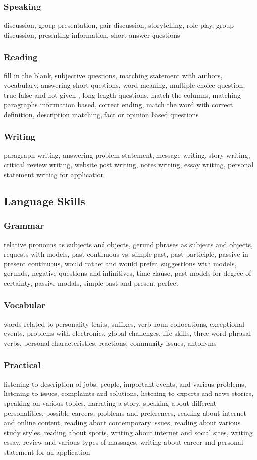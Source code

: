 \documentclass[twocolumn]{article}
\begin{document}
    \subsubsection*{Speaking}
    discussion, group presentation, pair discussion, storytelling, role play, group discussion, presenting information, short answer questions
    \subsubsection*{Reading}
    fill in the blank, subjective questions, matching statement with authors, vocabulary, answering short questions, word meaning, multiple choice question, true false and not given , long length questions, match the columns, matching paragraphs information based, correct ending, match the word with correct definition, description matching, fact or opinion based questions
    \subsubsection*{Writing}
    paragraph writing, answering problem statement, message writing, story writing, critical review writing, website post writing, notes writing, essay writing, personal statement writing for application
    \subsection*{Language Skills}
    \subsubsection*{Grammar}
    relative pronouns as subjects and objects, gerund phrases as subjects and objects, requests with models, past continuous vs. simple past, past participle, passive in present continuous, would rather and would prefer, suggestions with models, gerunds, negative questions and infinitives, time clause, past models for degree of certainty, passive modals, simple past and present perfect
    \subsubsection*{Vocabular}
    words related to personality traits, suffixes, verb-noun collocations, exceptional events, problems with electronics, global challenges, life skills, three-word phrasal verbs, personal characteristics, reactions, community issues, antonyms 
    \subsubsection*{Practical}
    listening to description of jobs, people, important events, and various problems, listening to issues, complaints and solutions, listening to experts and news stories, speaking on various topics, 
    narrating a story, speaking about different personalities, possible careers, problems and preferences, reading about internet and online content, reading about contemporary issues, reading about various 
    study styles, reading about sports, writing about internet and social sites, writing essay, review and various types of massages, writing about career and personal statement for an application \\
    
\end{document}
